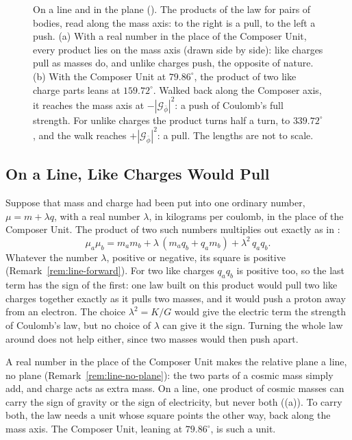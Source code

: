 \begin{figure}[tb]
\caption[On a line and in the plane]{On a line and in the plane (). The products of the law for pairs of bodies, read along the mass axis: to the right is a pull, to the left a push. (a) With a real number in the place of the Composer Unit, every product lies on the mass axis (drawn side by side): like charges pull as masses do, and unlike charges push, the opposite of nature. (b) With the Composer Unit at $79.86^\circ$, the product of two like charge parts leans at $159.72^\circ$. Walked back along the Composer axis, it reaches the mass axis at $-|\mathcal{G}_{\bar{\phi}}|^2$: a push of Coulomb's full strength. For unlike charges the product turns half a turn, to $339.72^\circ$, and the walk reaches $+|\mathcal{G}_{\bar{\phi}}|^2$: a pull. The lengths are not to scale.}
\label{fig:line-and-plane}
\end{figure}

\subsection{On a Line, Like Charges Would Pull}\label{subsec:why-line}

Suppose that mass and charge had been put into one ordinary number, $\mu = m + \lambda q$, with a real number $\lambda$, in kilograms per coulomb, in the place of the Composer Unit. The product of two such numbers multiplies out exactly as in :
\[
\mu_a \mu_b = m_a m_b + \lambda\,(m_a q_b + q_a m_b) + \lambda^2\,q_a q_b .
\]
Whatever the number $\lambda$, positive or negative, its square is positive (Remark~\ref{rem:line-forward}). For two like charges $q_a q_b$ is positive too, so the last term has the sign of the first: one law built on this product would pull two like charges together exactly as it pulls two masses, and it would push a proton away from an electron. The choice $\lambda^2 = K/G$ would give the electric term the strength of Coulomb's law, but no choice of $\lambda$ can give it the sign. Turning the whole law around does not help either, since two masses would then push apart.

A real number in the place of the Composer Unit makes the relative plane a line, no plane (Remark~\ref{rem:line-no-plane}): the two parts of a cosmic mass simply add, and charge acts as extra mass. On a line, one product of cosmic masses can carry the sign of gravity or the sign of electricity, but never both ((a)). To carry both, the law needs a unit whose square points the other way, back along the mass axis. The Composer Unit, leaning at $79.86^\circ$, is such a unit.

